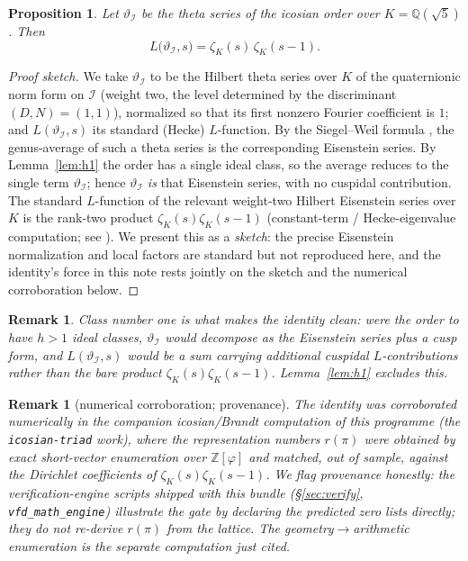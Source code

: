 \documentclass[11pt]{article}
\newtheorem{proposition}[theorem]{Proposition}
\newtheorem{remark}[theorem]{Remark}
\theoremstyle{definition}
\newcommand{\Z}{\mathbb{Z}}
\newcommand{\Q}{\mathbb{Q}}
\newcommand{\zetaK}{\zeta_{K}}
\newcommand{\Icos}{\mathcal{I}}
\renewcommand{\Theta}{\vartheta}
\begin{document}
\begin{proposition}\label{res:icosian}
Let $\Theta_{\Icos}$ be the theta series of the icosian order over $K=\Q(\sqrt5)$.
Then
\[
   L\bigl(\Theta_{\Icos},s\bigr)=\zetaK(s)\,\zetaK(s-1).
\]
\end{proposition}
\begin{proof}[Proof sketch]
We take $\Theta_{\Icos}$ to be the Hilbert theta series over $K$ of the quaternionic
norm form on $\Icos$ (weight two, the level determined by the discriminant
$(D,N)=(1,1)$), normalized so that its first nonzero Fourier coefficient is $1$; and
$L(\Theta_{\Icos},s)$ its standard (Hecke) $L$-function. By the Siegel--Weil formula
\cite{Siegel,Weil1965}, the genus-average of such a theta series is the corresponding
Eisenstein series. By Lemma~\ref{lem:h1} the order has a single ideal class, so the
average reduces to the single term $\Theta_{\Icos}$; hence $\Theta_{\Icos}$ \emph{is}
that Eisenstein series, with no cuspidal contribution. The standard $L$-function of the
relevant weight-two Hilbert Eisenstein series over $K$ is the rank-two product
$\zetaK(s)\zetaK(s-1)$ (constant-term / Hecke-eigenvalue computation; see
\cite{Eichler,HMF}). We present this as a \emph{sketch}: the precise Eisenstein
normalization and local factors are standard but not reproduced here, and the
identity's force in this note rests jointly on the sketch and the numerical
corroboration below.
\end{proof}
\begin{remark}
Class number one is what makes the identity clean: were the order to have $h>1$ ideal
classes, $\Theta_{\Icos}$ would decompose as the Eisenstein series \emph{plus} a cusp
form, and $L(\Theta_{\Icos},s)$ would be a sum carrying additional cuspidal
$L$-contributions rather than the bare product $\zetaK(s)\zetaK(s-1)$.
Lemma~\ref{lem:h1} excludes this.
\end{remark}
\begin{remark}[numerical corroboration; provenance]
The identity was corroborated numerically in the companion icosian/Brandt computation
of this programme (the \texttt{icosian-triad} work), where the representation numbers
$r(\pi)$ were obtained by exact short-vector enumeration over $\Z[\varphi]$ and matched,
out of sample, against the Dirichlet coefficients of $\zetaK(s)\zetaK(s-1)$. We flag
provenance honestly: the verification-engine scripts shipped \emph{with this bundle}
(\S\ref{sec:verify}, \texttt{vfd\_math\_engine}) illustrate the gate by declaring the
predicted zero lists directly; they do \emph{not} re-derive $r(\pi)$ from the lattice.
The geometry$\to$arithmetic enumeration is the separate computation just cited.
\end{remark}
\end{document}
